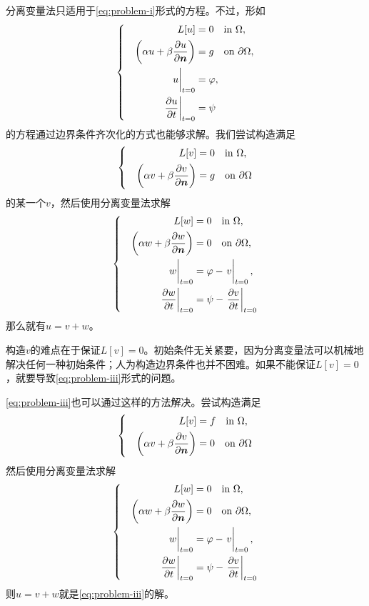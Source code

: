 \documentclass[UTF8]{ctexart}
\newenvironment{bigcase}{\left\{ \quad \begin{aligned}}{\end{aligned}\right.}
\begin{document}
分离变量法只适用于\eqref{eq:problem-i}形式的方程。不过，形如
\begin{equation}
    \begin{bigcase}
        L[u] &= 0 \quad \text{in $\Omega$}, \\
        \left(\alpha u + \beta \pdv{u}{\vb*{n}} \right) &= g \quad \text{on $\partial \Omega$}, \\
        \eval{u}_{t=0} &= \varphi, \\
        \eval{\pdv{u}{t}}_{t=0} &= \psi
    \end{bigcase}
\end{equation}
的方程通过边界条件齐次化的方式也能够求解。我们尝试构造满足
\[
    \begin{bigcase}
        L[v] &= 0 \quad \text{in $\Omega$}, \\
        \left(\alpha v + \beta \pdv{v}{\vb*{n}} \right) &= g \quad \text{on $\partial \Omega$}
    \end{bigcase}
\]
的某一个$v$，然后使用分离变量法求解
\[
    \begin{bigcase}
        L[w] &= 0 \quad \text{in $\Omega$}, \\
        \left(\alpha w + \beta \pdv{w}{\vb*{n}} \right) &= 0 \quad \text{on $\partial \Omega$}, \\
        \eval{w}_{t=0} &= \varphi - \eval{v}_{t=0}, \\
        \eval{\pdv{w}{t}}_{t=0} &= \psi - \eval{\pdv{v}{t}}_{t=0}
    \end{bigcase}
\]
那么就有$u=v+w$。

构造$v$的难点在于保证$L[v]=0$。初始条件无关紧要，因为分离变量法可以机械地解决任何一种初始条件；人为构造边界条件也并不困难。如果不能保证$L[v]=0$，就要导致\eqref{eq:problem-iii}形式的问题。

\eqref{eq:problem-iii}也可以通过这样的方法解决。尝试构造满足
\[
    \begin{bigcase}
        L[v] &= f \quad \text{in $\Omega$}, \\
        \left(\alpha v + \beta \pdv{v}{\vb*{n}} \right) &= 0 \quad \text{on $\partial \Omega$}
    \end{bigcase}
\]
然后使用分离变量法求解
\[
    \begin{bigcase}
        L[w] &= 0 \quad \text{in $\Omega$}, \\
        \left(\alpha w + \beta \pdv{w}{\vb*{n}} \right) &= 0 \quad \text{on $\partial \Omega$}, \\
        \eval{w}_{t=0} &= \varphi - \eval{v}_{t=0}, \\
        \eval{\pdv{w}{t}}_{t=0} &= \psi - \eval{\pdv{v}{t}}_{t=0}
    \end{bigcase}
\]
则$u=v+w$就是\eqref{eq:problem-iii}的解。
\end{document}
